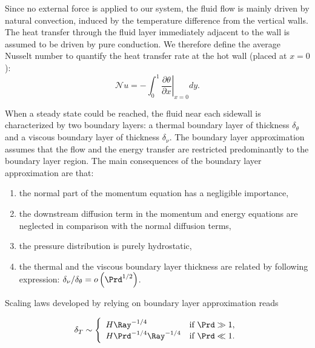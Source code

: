 Since no external force is applied to our system, the fluid flow is mainly driven by natural convection, induced by the temperature difference from the vertical walls.
The heat transfer through the fluid layer immediately adjacent to the wall is assumed to be driven by pure conduction.
We therefore define the average Nusselt number to quantify the heat transfer rate at the hot wall (placed at $x=0$):
\begin{equation}\label{eq-def-Nu}
   \mathcal{N}\!u = - \int_0^1 \left. \frac{\partial \theta}{\partial x} \right |_{x=0} dy.
\end{equation}

When a steady state could be reached, the fluid near each sidewall is characterized by two boundary layers: a thermal boundary layer of thickness $\delta_{\theta}$ and a viscous boundary layer of thickness $\delta_\nu$.
The boundary layer approximation assumes that the flow and the energy transfer are restricted predominantly to the boundary layer region.
The main consequences of the boundary layer approximation are that:
\begin{enumerate}[label=(\roman*)]
\item the normal part of the momentum equation has a negligible importance,
\item the downstream diffusion term in the momentum and energy equations are neglected in comparison with the normal diffusion terms,
\item the pressure distribution is purely hydrostatic,
\item the thermal and the viscous boundary layer thickness are related by following expression: $\delta_\nu/\delta_\theta = o \left(\Prd^{1/2} \right)$.
\end{enumerate}

\noindent Scaling laws developed by \cite{bejan2013convection} relying on boundary layer approximation reads

\begin{equation} \label{eq-bnd-layer-T}
   \delta_T \sim \left\{
   \begin{array}{ll}
   H \Ray^{-1/4} &	 \mbox{if }  \Prd \gg 1,\\
   H \Prd^{-1/4} \Ray^{-1/4} &   \mbox{if } \Prd \ll 1.
   \end{array}
   \right.
\end{equation}

